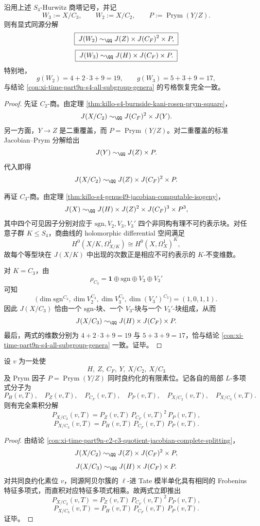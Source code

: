 \begin{conclusion}\label{con:xi-time-part9n-c2-c3-quotient-jacobian-complete-splitting}
沿用上述 \(S_4\)-Hurwitz 商塔记号，并记
\[
W_3:=X/C_3,\qquad
W_2:=X/C_2,\qquad
P:=\operatorname{Prym}(Y/Z).
\]
则有显式同源分解
\[
\boxed{\;
J(W_2)\sim_{\QQ}J(Z)\times J(C_F)^2\times P,
\;}
\]
\[
\boxed{\;
J(W_3)\sim_{\QQ}J(H)\times J(C_F)\times P.
\;}
\]
特别地，
\[
g(W_2)=4+2\cdot 3+9=19,
\qquad
g(W_3)=5+3+9=17,
\]
与结论 \ref{con:xi-time-part9n-s4-all-subgroup-genera} 的亏格恢复完全一致。
\end{conclusion}
\begin{proof}
先证 \(C_2\)-商。由定理 \ref{thm:killo-s4-burnside-kani-rosen-prym-square}，
\[
J(X/C_2)\sim_{\QQ}J(C_F)^2\times J(Y).
\]
另一方面，\(Y\to Z\) 是二重覆盖，而 \(P=\operatorname{Prym}(Y/Z)\)。对二重覆盖的标准 Jacobian--Prym 分解给出
\[
J(Y)\sim_{\QQ}J(Z)\times P.
\]
代入即得
\[
J(X/C_2)\sim_{\QQ}J(Z)\times J(C_F)^2\times P.
\]

再证 \(C_3\)-商。由定理 \ref{thm:killo-s4-genus49-jacobian-computable-isogeny}，
\[
J(X)\sim_{\QQ}J(H)\times J(Z)^2\times J(C_F)^3\times P^3,
\]
其中四个可见因子分别对应于 \(\mathrm{sgn},V_2,V_3,V_3'\) 四个非同构有理不可约表示块。对任意子群 \(K\le S_4\)，商曲线的 holomorphic differential 空间满足
\[
H^0(X/K,\Omega_{X/K}^1)\cong H^0(X,\Omega_X^1)^K,
\]
故每个等型块在 \(J(X/K)\) 中出现的次数正是相应不可约表示的 \(K\)-不变维数。

对 \(K=C_3\)，由
\[
\rho_{C_3}=\mathbf 1\oplus \mathrm{sgn}\oplus V_3\oplus V_3'
\]
可知
\[
\bigl(\dim \mathrm{sgn}^{C_3},\dim V_2^{C_3},\dim V_3^{C_3},\dim (V_3')^{C_3}\bigr)=(1,0,1,1).
\]
因此 \(J(X/C_3)\) 恰由一个 \(\mathrm{sgn}\)-块、一个 \(V_3\)-块与一个 \(V_3'\)-块组成，从而
\[
J(X/C_3)\sim_{\QQ}J(H)\times J(C_F)\times P.
\]
最后，两式的维数分别为 \(4+2\cdot 3+9=19\) 与 \(5+3+9=17\)，恰与结论 \ref{con:xi-time-part9n-s4-all-subgroup-genera} 一致。证毕。
\end{proof}

\begin{conclusion}\label{con:xi-time-part9n-c2-c3-local-lfactor-complete-splitting}
设 \(v\) 为一处使
\[
H,\ Z,\ C_F,\ Y,\ X/C_2,\ X/C_3
\]
及 Prym 因子 \(P=\operatorname{Prym}(Y/Z)\) 同时良约化的有限素位。记各自的局部 \(L\)-多项式分子为
\[
P_H(v,T),\quad P_Z(v,T),\quad P_{C_F}(v,T),\quad
P_P(v,T),\quad P_{X/C_2}(v,T),\quad P_{X/C_3}(v,T).
\]
则有完全乘积分解
\[
\boxed{\;
P_{X/C_2}(v,T)=P_Z(v,T)\,P_{C_F}(v,T)^2\,P_P(v,T),
\;}
\]
\[
\boxed{\;
P_{X/C_3}(v,T)=P_H(v,T)\,P_{C_F}(v,T)\,P_P(v,T).
\;}
\]
\end{conclusion}
\begin{proof}
由结论 \ref{con:xi-time-part9n-c2-c3-quotient-jacobian-complete-splitting}，
\[
J(X/C_2)\sim_{\QQ}J(Z)\times J(C_F)^2\times P,
\]
\[
J(X/C_3)\sim_{\QQ}J(H)\times J(C_F)\times P.
\]
对共同良约化素位 \(v\)，同源阿贝尔簇的 \(\ell\)-进 Tate 模半单化具有相同的 Frobenius 特征多项式，而直积对应特征多项式相乘。故两式立即推出
\[
P_{X/C_2}(v,T)=P_Z(v,T)\,P_{C_F}(v,T)^2\,P_P(v,T),
\]
\[
P_{X/C_3}(v,T)=P_H(v,T)\,P_{C_F}(v,T)\,P_P(v,T).
\]
证毕。
\end{proof}

